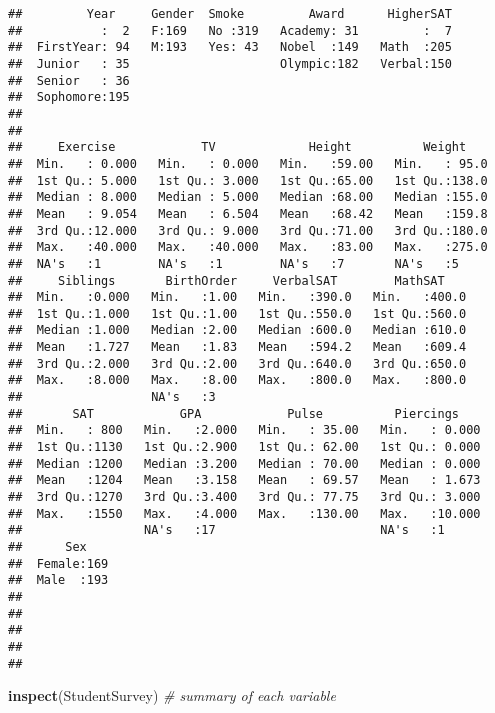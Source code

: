\documentclass[]{book}
\newenvironment{Shaded}{\begin{snugshade}}{\end{snugshade}}
\newcommand{\CommentTok}[1]{\textcolor[rgb]{0.56,0.35,0.01}{\textit{#1}}}
\newcommand{\KeywordTok}[1]{\textcolor[rgb]{0.13,0.29,0.53}{\textbf{#1}}}
\newcommand{\NormalTok}[1]{#1}
\begin{document}
\begin{verbatim}
##         Year     Gender  Smoke         Award      HigherSAT  
##           :  2   F:169   No :319   Academy: 31         :  7  
##  FirstYear: 94   M:193   Yes: 43   Nobel  :149   Math  :205  
##  Junior   : 35                     Olympic:182   Verbal:150  
##  Senior   : 36                                               
##  Sophomore:195                                               
##                                                              
##                                                              
##     Exercise            TV             Height          Weight     
##  Min.   : 0.000   Min.   : 0.000   Min.   :59.00   Min.   : 95.0  
##  1st Qu.: 5.000   1st Qu.: 3.000   1st Qu.:65.00   1st Qu.:138.0  
##  Median : 8.000   Median : 5.000   Median :68.00   Median :155.0  
##  Mean   : 9.054   Mean   : 6.504   Mean   :68.42   Mean   :159.8  
##  3rd Qu.:12.000   3rd Qu.: 9.000   3rd Qu.:71.00   3rd Qu.:180.0  
##  Max.   :40.000   Max.   :40.000   Max.   :83.00   Max.   :275.0  
##  NA's   :1        NA's   :1        NA's   :7       NA's   :5      
##     Siblings       BirthOrder     VerbalSAT        MathSAT     
##  Min.   :0.000   Min.   :1.00   Min.   :390.0   Min.   :400.0  
##  1st Qu.:1.000   1st Qu.:1.00   1st Qu.:550.0   1st Qu.:560.0  
##  Median :1.000   Median :2.00   Median :600.0   Median :610.0  
##  Mean   :1.727   Mean   :1.83   Mean   :594.2   Mean   :609.4  
##  3rd Qu.:2.000   3rd Qu.:2.00   3rd Qu.:640.0   3rd Qu.:650.0  
##  Max.   :8.000   Max.   :8.00   Max.   :800.0   Max.   :800.0  
##                  NA's   :3                                     
##       SAT            GPA            Pulse          Piercings     
##  Min.   : 800   Min.   :2.000   Min.   : 35.00   Min.   : 0.000  
##  1st Qu.:1130   1st Qu.:2.900   1st Qu.: 62.00   1st Qu.: 0.000  
##  Median :1200   Median :3.200   Median : 70.00   Median : 0.000  
##  Mean   :1204   Mean   :3.158   Mean   : 69.57   Mean   : 1.673  
##  3rd Qu.:1270   3rd Qu.:3.400   3rd Qu.: 77.75   3rd Qu.: 3.000  
##  Max.   :1550   Max.   :4.000   Max.   :130.00   Max.   :10.000  
##                 NA's   :17                       NA's   :1       
##      Sex     
##  Female:169  
##  Male  :193  
##              
##              
##              
##              
## 
\end{verbatim}

\begin{Shaded}
\begin{Highlighting}[]
\KeywordTok{inspect}\NormalTok{(StudentSurvey) }\CommentTok{# summary of each variable}
\end{Highlighting}
\end{Shaded}
\end{document}

